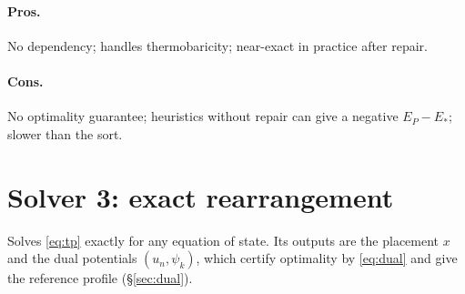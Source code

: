 \documentclass[11pt,a4paper]{article}
\begin{document}
\paragraph{Pros.} No dependency; handles thermobaricity; near-exact in practice after repair.
\paragraph{Cons.} No optimality guarantee; heuristics without repair can give a negative $E_P-E_*$; slower than the sort.

\section{Solver 3: exact rearrangement}\label{sec:exact}
Solves \eqref{eq:tp} exactly for any equation of state. Its outputs are the placement $x$ and the dual potentials
$(u_n,\psi_k)$, which certify optimality by \eqref{eq:dual} and give the reference profile (\S\ref{sec:dual}).
\end{document}
